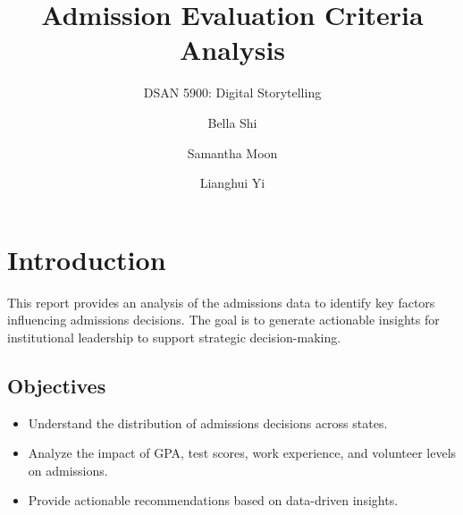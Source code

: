\documentclass[
  letterpaper,
  DIV=11,
  numbers=noendperiod]{scrartcl}
\title{Admission Evaluation Criteria Analysis}
\subtitle{DSAN 5900: Digital Storytelling}
\author{Bella Shi \and Samantha Moon \and Lianghui Yi}
\date{}
\providecommand{\tightlist}{%
  \setlength{\itemsep}{0pt}\setlength{\parskip}{0pt}}\usepackage{longtable,booktabs,array}
\begin{document}
\maketitle

\section{Introduction}\label{introduction}

This report provides an analysis of the admissions data to identify key
factors influencing admissions decisions. The goal is to generate
actionable insights for institutional leadership to support strategic
decision-making.

\subsection{Objectives}\label{objectives}

\begin{itemize}
\tightlist
\item
  Understand the distribution of admissions decisions across states.
\item
  Analyze the impact of GPA, test scores, work experience, and volunteer
  levels on admissions.
\item
  Provide actionable recommendations based on data-driven insights.
\end{itemize}
\end{document}
